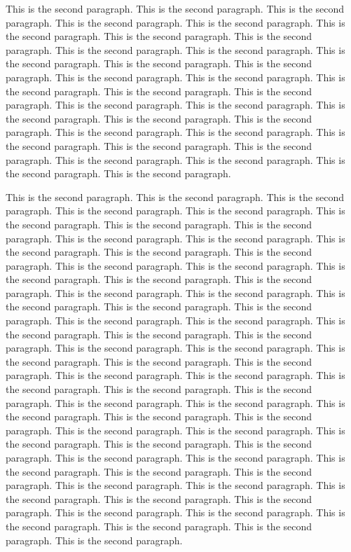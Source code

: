 This is the second paragraph. This is the second paragraph. This is the second paragraph. This is the second paragraph.
This is the second paragraph. This is the second paragraph. This is the second paragraph. This is the second paragraph.
This is the second paragraph. This is the second paragraph. This is the second paragraph. This is the second paragraph.
This is the second paragraph. This is the second paragraph. This is the second paragraph. This is the second paragraph. 
This is the second paragraph. This is the second paragraph. This is the second paragraph. This is the second paragraph.
This is the second paragraph. This is the second paragraph. This is the second paragraph. This is the second paragraph.
This is the second paragraph. This is the second paragraph. This is the second paragraph. This is the second paragraph.
This is the second paragraph. This is the second paragraph. This is the second paragraph. This is the second paragraph. 

This is the second paragraph. This is the second paragraph. This is the second paragraph. This is the second paragraph.
This is the second paragraph. This is the second paragraph. This is the second paragraph. This is the second paragraph.
This is the second paragraph. This is the second paragraph. This is the second paragraph. This is the second paragraph.
This is the second paragraph. This is the second paragraph. This is the second paragraph. This is the second paragraph. 
This is the second paragraph. This is the second paragraph. This is the second paragraph. This is the second paragraph.
This is the second paragraph. This is the second paragraph. This is the second paragraph. This is the second paragraph.
This is the second paragraph. This is the second paragraph. This is the second paragraph. This is the second paragraph.
This is the second paragraph. This is the second paragraph. This is the second paragraph. This is the second paragraph. 
This is the second paragraph. This is the second paragraph. This is the second paragraph. This is the second paragraph.
This is the second paragraph. This is the second paragraph. This is the second paragraph. This is the second paragraph.
This is the second paragraph. This is the second paragraph. This is the second paragraph. This is the second paragraph.
This is the second paragraph. This is the second paragraph. This is the second paragraph. This is the second paragraph. 
This is the second paragraph. This is the second paragraph. This is the second paragraph. This is the second paragraph.
This is the second paragraph. This is the second paragraph. This is the second paragraph. This is the second paragraph.
This is the second paragraph. This is the second paragraph. This is the second paragraph. This is the second paragraph.
This is the second paragraph. This is the second paragraph. This is the second paragraph. This is the second paragraph. 
\vfill\eject
